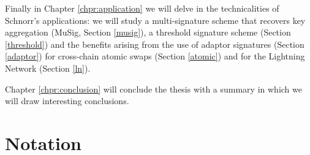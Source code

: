 \bigskip
\noindent
Finally in Chapter \ref{chpr:application} we will delve in the technicalities of Schnorr's applications: we will study a multi-signature scheme that recovers key aggregation (MuSig, Section \ref{musig}), a threshold signature scheme (Section \ref{threshold}) and the benefits arising from the use of adaptor signatures (Section \ref{adaptor}) for cross-chain atomic swaps (Section \ref{atomic}) and for the Lightning Network (Section \ref{ln}).

\bigskip
\noindent
Chapter \ref{chpr:conclusion} will conclude the thesis with a summary in which we will draw interesting conclusions.
\bigskip

\bigskip

\section{Notation}
